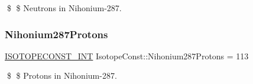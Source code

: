 \$ \$ Neutrons in Nihonium-\/287. \mbox{\label{group___isotope_const-_nihonium-_nh287_ga6fbb4a6b038d92c2b20418e9f1b1e39d}} 
\subsubsection{\texorpdfstring{Nihonium287\+Protons}{Nihonium287Protons}}
{\footnotesize\ttfamily \mbox{\hyperlink{group___isotope_const-_macros_ga5f18360b3e99483a35c32d789e62621c}{I\+S\+O\+T\+O\+P\+E\+C\+O\+N\+S\+T\+\_\+\+I\+NT}} Isotope\+Const\+::\+Nihonium287\+Protons = 113}

\$ \$ Protons in Nihonium-\/287. 